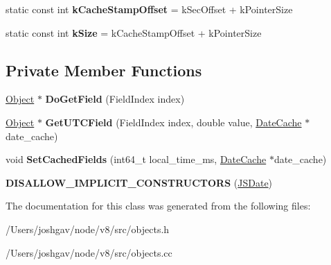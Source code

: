 \begin{DoxyCompactItemize}
\item 
static const int {\bfseries k\+Cache\+Stamp\+Offset} = k\+Sec\+Offset + k\+Pointer\+Size\hypertarget{classv8_1_1internal_1_1_j_s_date_a9c1aa5942a2e169bae870d5150778dca}{}\label{classv8_1_1internal_1_1_j_s_date_a9c1aa5942a2e169bae870d5150778dca}

\item 
static const int {\bfseries k\+Size} = k\+Cache\+Stamp\+Offset + k\+Pointer\+Size\hypertarget{classv8_1_1internal_1_1_j_s_date_a9416fc77a4defa89edf9d7f92b2a8348}{}\label{classv8_1_1internal_1_1_j_s_date_a9416fc77a4defa89edf9d7f92b2a8348}

\end{DoxyCompactItemize}
\subsection*{Private Member Functions}
\begin{DoxyCompactItemize}
\item 
\hyperlink{classv8_1_1internal_1_1_object}{Object} $\ast$ {\bfseries Do\+Get\+Field} (Field\+Index index)\hypertarget{classv8_1_1internal_1_1_j_s_date_a81aa9ac34f4df57453486ad91f9cab0f}{}\label{classv8_1_1internal_1_1_j_s_date_a81aa9ac34f4df57453486ad91f9cab0f}

\item 
\hyperlink{classv8_1_1internal_1_1_object}{Object} $\ast$ {\bfseries Get\+U\+T\+C\+Field} (Field\+Index index, double value, \hyperlink{classv8_1_1internal_1_1_date_cache}{Date\+Cache} $\ast$date\+\_\+cache)\hypertarget{classv8_1_1internal_1_1_j_s_date_a4eae3f53d68164c12c3ceb55e3e181f3}{}\label{classv8_1_1internal_1_1_j_s_date_a4eae3f53d68164c12c3ceb55e3e181f3}

\item 
void {\bfseries Set\+Cached\+Fields} (int64\+\_\+t local\+\_\+time\+\_\+ms, \hyperlink{classv8_1_1internal_1_1_date_cache}{Date\+Cache} $\ast$date\+\_\+cache)\hypertarget{classv8_1_1internal_1_1_j_s_date_aca83e50b36fc984a0fdd5db8598a9248}{}\label{classv8_1_1internal_1_1_j_s_date_aca83e50b36fc984a0fdd5db8598a9248}

\item 
{\bfseries D\+I\+S\+A\+L\+L\+O\+W\+\_\+\+I\+M\+P\+L\+I\+C\+I\+T\+\_\+\+C\+O\+N\+S\+T\+R\+U\+C\+T\+O\+RS} (\hyperlink{classv8_1_1internal_1_1_j_s_date}{J\+S\+Date})\hypertarget{classv8_1_1internal_1_1_j_s_date_a7eeda2dd37c9fcca62cb730effd113f8}{}\label{classv8_1_1internal_1_1_j_s_date_a7eeda2dd37c9fcca62cb730effd113f8}

\end{DoxyCompactItemize}


The documentation for this class was generated from the following files\+:\begin{DoxyCompactItemize}
\item 
/\+Users/joshgav/node/v8/src/objects.\+h\item 
/\+Users/joshgav/node/v8/src/objects.\+cc\end{DoxyCompactItemize}
